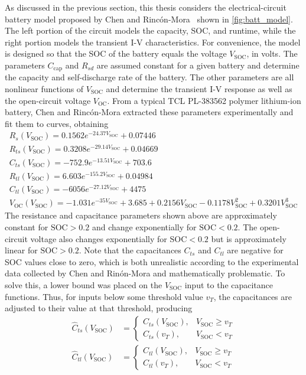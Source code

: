 \documentclass[../zhang_thesis.tex]{subfiles}
\begin{document}
As discussed in the previous section, this thesis considers the electrical-circuit battery model proposed by Chen and Rinc\'on-Mora~\cite{chen06} shown in \cref{fig:batt_model}. The left portion of the circuit models the capacity, SOC, and runtime, while the right portion models the transient I-V characteristics.  For convenience, the model is designed so that the SOC of the battery equals the voltage $V_\text{SOC}$, in volts. The parameters $C_\text{cap}$ and
$R_{sd}$ are assumed constant for a given battery and determine the capacity and self-discharge rate of the battery. The other parameters are all nonlinear functions of $V_\text{SOC}$ and determine the transient I-V response as well as the open-circuit voltage $V_\text{OC}$. From a typical TCL PL-383562 polymer lithium-ion battery, Chen and Rinc\'on-Mora extracted these parameters experimentally and fit them to curves, obtaining
\begin{gather}
    R_s(V_\text{SOC}) = 0.1562 e^{-24.37 V_\text{SOC}} + 0.07446 \label{eq:nl_param_1} \\
    R_{ts}(V_\text{SOC}) = 0.3208 e^{-29.14 V_\text{SOC}} + 0.04669 \\
    C_{ts}(V_\text{SOC}) = -752.9 e^{-13.51 V_\text{SOC}} + 703.6 \\
    R_{tl}(V_\text{SOC}) = 6.603 e^{-155.2 V_\text{SOC}} + 0.04984 \\
    C_{tl}(V_\text{SOC}) = -6056 e^{-27.12 V_\text{SOC}} + 4475 \\
    V_\text{OC}(V_\text{SOC}) = -1.031 e^{-35 V_\text{SOC}} + 3.685 + 0.2156 V_\text{SOC} - 0.1178 V_\text{SOC}^2 + 0.3201 V_\text{SOC}^3 \label{eq:nl_param_6}
\end{gather}
The resistance and capacitance parameters shown above are approximately constant for $\text{SOC}>0.2$ and change exponentially for $\text{SOC}<0.2$. The open-circuit voltage also changes exponentially for $\text{SOC}<0.2$ but is approximately linear for $\text{SOC}>0.2$. Note that the capacitances $C_{ts}$ and $C_{tl}$ are negative for SOC values close to zero, which is both unrealistic according to the experimental data collected by Chen and Rin\'on-Mora and
mathematically problematic. To solve this, a lower bound was placed on the $V_\text{SOC}$ input to the capacitance functions. Thus, for inputs below some threshold value $v_T$, the capacitances are adjusted to their value at that threshold, producing
\begin{align}
    \hat{C}_{ts}(V_\text{SOC}) &= \begin{cases}
        C_{ts}(V_\text{SOC}), & V_\text{SOC} \ge v_T \\
        C_{ts}(v_T), & V_\text{SOC} < v_T
        \end{cases} \label{eq:Cts_thres} \\
    \hat{C}_{tl}(V_\text{SOC}) &= \begin{cases}
        C_{tl}(V_\text{SOC}), & V_\text{SOC} \ge v_T \\
        C_{tl}(v_T), & V_\text{SOC} < v_T \label{eq:Ctl_thres}
        \end{cases}
\end{align}
\end{document}
